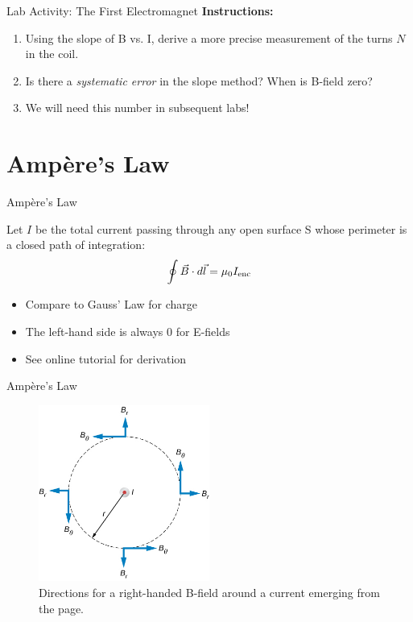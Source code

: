 \documentclass{beamer}
\begin{document}
\begin{frame}{Lab Activity: The First Electromagnet}
\textbf{Instructions:}
\begin{enumerate}
\item Using the slope of B vs. I, derive a more precise measurement of the turns $N$ in the coil.
\item Is there a \textit{systematic error} in the slope method?  When is B-field zero?
\item We will need this number in subsequent labs!
\end{enumerate}
\end{frame}

\section{Amp\`{e}re's Law}

\begin{frame}{Amp\`{e}re's Law}
\begin{tcolorbox}[colback=white,colframe=black!40!black,title=Amp\`{e}re's Law]
\alert{Let $I$ be the total current passing through any open surface S whose perimeter is a closed path of integration:
\begin{equation}
\oint \vec{B} \cdot d\vec{l} = \mu_0 I_{\rm enc}
\label{eq:ampereslaw}
\end{equation}}
\end{tcolorbox}
\begin{itemize}
\item Compare to Gauss' Law for charge
\item The left-hand side is always 0 for E-fields
\item See online tutorial for derivation
\end{itemize}
\end{frame}

\begin{frame}{Amp\`{e}re's Law}
\begin{figure}
\centering
\includegraphics[width=0.5\textwidth]{figures/amplaw1.jpeg}
\caption{\label{fig:amplaw1} Directions for a right-handed B-field around a current emerging from the page.}
\end{figure}
\end{frame}
\end{document}
